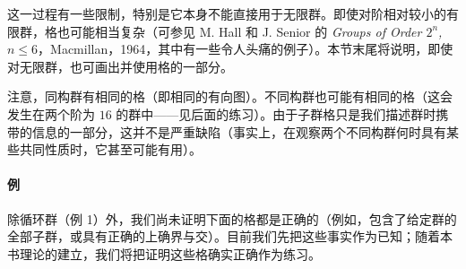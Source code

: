 这一过程有一些限制，特别是它本身不能直接用于无限群。即使对阶相对较小的有限群，格也可能相当复杂（可参见 M. Hall 和 J. Senior 的 \textit{Groups of Order $2^n$, $n\leq6$}，Macmillan，1964，其中有一些令人头痛的例子）。本节末尾将说明，即使对无限群，也可画出并使用格的一部分。

注意，同构群有相同的格（即相同的有向图）。不同构群也可能有相同的格（这会发生在两个阶为 $16$ 的群中——见后面的练习）。由于子群格只是我们描述群时携带的信息的一部分，这并不是严重缺陷（事实上，在观察两个不同构群何时具有某些共同性质时，它甚至可能有用）。

\paragraph{例}
除循环群（例 1）外，我们尚未证明下面的格都是正确的（例如，包含了给定群的全部子群，或具有正确的上确界与交）。目前我们先把这些事实作为已知；随着本书理论的建立，我们将把证明这些格确实正确作为练习。

